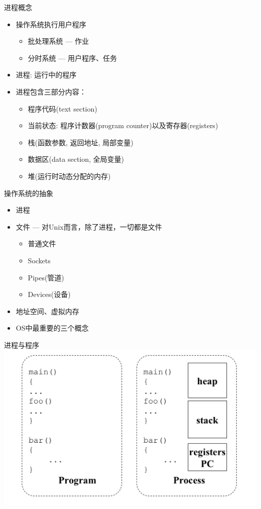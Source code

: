 \documentclass[xcolor=svgnames]{beamer}
\begin{document}
\begin{CJK*}{UTF8}{gbsn}
\begin{frame}{进程概念}
\begin{itemize}
\item 操作系统执行用户程序
\begin{itemize}
\item 批处理系统 --- 作业
\item 分时系统 --- 用户程序、任务
\end{itemize}
\item 进程: 运行中的程序 
\item 进程包含三部分内容：
\begin{itemize}
\item 程序代码(text section)
\item 当前状态: 程序计数器(program counter)以及寄存器(registers)
\item 栈(函数参数, 返回地址, 局部变量)
\item 数据区(data section, 全局变量)
\item 堆(运行时动态分配的内存)
\end{itemize}
\end{itemize}
\end{frame}


\begin{frame}{操作系统的抽象}
\begin{itemize}
\item 进程 
\item 文件 --- 对Unix而言，除了进程，一切都是文件
\begin{itemize}
\item 普通文件
\item Sockets
\item Pipes(管道)
\item Devices(设备)
\end{itemize} 
\item 地址空间、虚拟内存
\item OS中最重要的三个概念
\end{itemize} 
\end{frame}

\begin{frame}{进程与程序}
\includegraphics[width=1.0\textwidth]{process.png}
\end{frame}


\end{CJK*}
\end{document}
